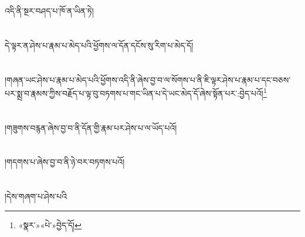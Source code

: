འདི་ནི་སྔར་བཤད་པ་ཁོ་ན་ཡིན་ཏེ།\chapter{ }དེ་ལྟར་ན་ཤེས་པ་རྣམ་པ་མེད་པའི་ཕྱོགས་ལ་དོན་དངོས་སུ་རིག་པ་མེད་དོ།\chapter{ }།གཞན་ཡང་ཤེས་པ་རྣམ་པ་མེད་པའི་ཕྱོགས་འདི་ནི་ཞེས་བྱ་བ་ལ་སོགས་པ་ནི་ཇི་ལྟར་ཤེས་པ་རྣམ་པ་དང་བཅས་པར་སྨྲ་བ་རྣམས་ཀྱིས་བརྗོད་པ་ལྟ་བུ་བཏགས་པ་གང་ཡིན་པ་དེ་ཡང་མེད་དོ་ཞེས་སྟོན་པར་:བྱེད་པའོ།\footnote{«སྣར་»«པེ་»བྱེད་དོ།}\chapter{ }།གཟུགས་བརྙན་ཞེས་བྱ་བ་ནི་དོན་གྱི་རྣམ་པར་ཤེས་པ་ལ་ཡོད་པའོ།\chapter{ }།གདགས་པ་ཞེས་བྱ་བ་ནི་ཉེ་བར་བཏགས་པའོ།\chapter{ }།དེས་གཞག་པ་ཤེས་པའི